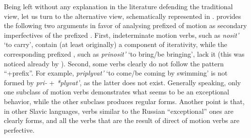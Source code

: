 
Being left without any explanation in the literature defending the traditional view, let us turn to the alternative view, schematically represented in . \citet{Regnell:44} provides the following two arguments in favor of analysing prefixed  of motion as secondary imperfectives of the prefixed . First, indeterminate motion verbs, such as \textit{nosit'}\textsubscript{\INDET} `to carry', contain (at least originally) a component of iterativity, while the corresponding prefixed , such as \textit{prinosit'} `to bring/be bringing', lack it (this was noticed already by \citealt{Mazon:1928}). Second, some verbs clearly do not follow the pattern ``+prefix''. For example, \textit{priplyvat'} `to come/be coming by swimming' is not formed by \textit{pri-} + \textit{*plyvat'}, as the latter does not exist. Generally speaking, only one subclass of motion verbs demonstrates what seems to be an exceptional behavior, while the other subclass produces regular  forms. Another point is that, in other Slavic languages, verbs similar to the Russian ``exceptional'' ones are clearly  forms, and all the verbs that are the result of direct  of motion verbs are perfective.

